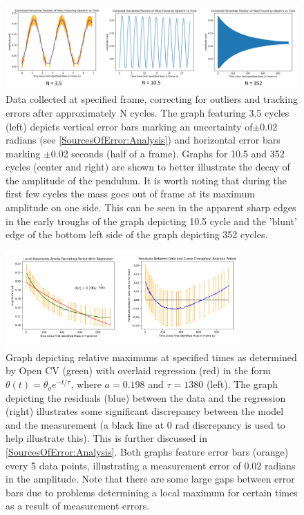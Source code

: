 \documentclass[11pt]{article}
\begin{document}
        \begin{figure}[H]
            \centering\includegraphics[width = 1\textwidth]{correctedGraph.PNG}
            \caption{Data collected at specified frame, correcting for outliers and tracking errors after approximately N cycles. The graph featuring 3.5 cycles (left) depicts vertical error bars marking an uncertainty of$\pm$0.02 radians (see \ref{SourcesOfError:Analysis}) and horizontal error bars marking $\pm$0.02 seconds (half of a frame). Graphs for 10.5 and 352 cycles (center and right) are shown to better illustrate the decay of the amplitude of the pendulum. It is worth noting that during the first few cycles the mass goes out of frame at its maximum amplitude on one side. This can be seen in the apparent sharp edges in the early troughs of the graph depicting 10.5 cycle and the 'blunt' edge of the bottom left side of the graph depicting 352 cycles.}
            \label{fig:correctedGraph}
        \end{figure}

        \begin{figure}[H]
            \centering\includegraphics[width = 0.8\textwidth]{tauGraph.PNG}
            \caption{Graph depicting relative maximums at specified times as determined by Open CV (green) with overlaid regression (red) in the form $\theta(t) = \theta_oe^{-t/\tau}$, where $a = 0.198$ and $\tau = 1380$ (left). The graph depicting the residuals (blue) between the data and the regression (right) illustrates some significant discrepancy between the model and the measurement (a black line at 0 rad discrepancy is used to help illustrate this). This is further discussed in \ref{SourcesOfError:Analysis}. Both graphs feature error bars (orange) every 5 data points, illustrating a measurement error of 0.02 radians in the amplitude. Note that there are some large gaps between error bars due to problems determining a local maximum for certain times as a result of measurement errors.}
            \label{fig:bestFit}
        \end{figure}
\end{document}
